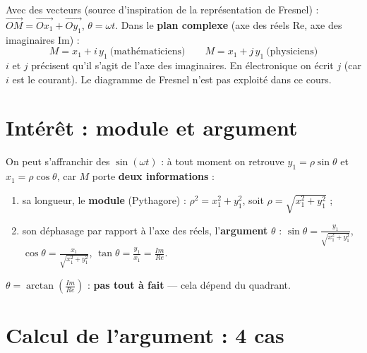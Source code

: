 
\begin{defnbox}[title=Plan complexe]
Avec des vecteurs (source d'inspiration de la représentation de Fresnel) :
$\overrightarrow{OM} = \overrightarrow{Ox_1} + \overrightarrow{Oy_1}$, $\theta = \omega t$.
Dans le \textbf{plan complexe} (axe des réels Re, axe des imaginaires Im) :
\[ M = x_1 + i\,y_1 \ \text{(mathématiciens)} \qquad M = x_1 + j\,y_1 \ \text{(physiciens)} \]
$i$ et $j$ précisent qu'il s'agit de l'axe des imaginaires. En électronique on écrit
\textbf{$j$} (car $i$ est le courant). Le diagramme de Fresnel n'est pas exploité dans ce
cours.
\end{defnbox}

\section{Intérêt : module et argument}


\begin{thmbox}[title=Module et argument]
On peut s'affranchir des $\sin(\omega t)$ : à tout moment on retrouve $y_1 = \rho\sin\theta$
et $x_1 = \rho\cos\theta$, car $M$ porte \textbf{deux informations} :
\begin{enumerate}
  \item sa \og longueur\fg{}, le \textbf{module} (Pythagore) :
        $\rho^2 = x_1^2 + y_1^2$, soit $\rho = \sqrt{x_1^2 + y_1^2}$ ;
  \item son déphasage par rapport à l'axe des réels, l'\textbf{argument} $\theta$ :
        $\sin\theta = \frac{y_1}{\sqrt{x_1^2+y_1^2}}$,
        $\cos\theta = \frac{x_1}{\sqrt{x_1^2+y_1^2}}$,
        $\tan\theta = \frac{y_1}{x_1} = \frac{Im}{Re}$.
\end{enumerate}
$\theta = \arctan\left(\frac{Im}{Re}\right)$ : \textbf{\og pas tout à fait\fg{}} --- cela
dépend du quadrant.
\end{thmbox}

\section{Calcul de l'argument : 4 cas}


